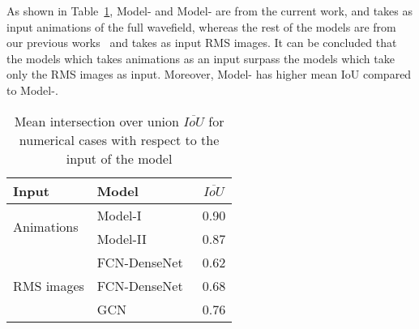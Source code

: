 As shown in Table~\ref{tab:meanIoU_vs_input}, Model- and Model- are from the current work, and takes as input animations of the full wavefield, whereas the rest of the models are from our previous works~\cite{Ijjeh2021, Ijjeh2022} and takes as input RMS images.
It can be concluded that the models which takes animations as an input surpass the models which take only the RMS images as input. 
Moreover, Model- has higher mean IoU compared to Model-.
\begin{table}[]
	\centering
	\caption{Mean intersection over union \(\overline{IoU}\) for numerical cases with respect to the input of the model}
	\begin{tabular}{llc}
		\toprule
		Input & Model & \(\overline{IoU}\) \\ 
		\midrule
		\multirow{2}{*}{Animations} & Model-I & 0.90 \\ & Model-II                    & 0.87     \\ \midrule
		\multirow{3}{*}{RMS images}  & FCN-DenseNet~\cite{Ijjeh2021} & 0.62     \\
		& FCN-DenseNet~\cite{Ijjeh2022} & 0.68     \\
		& GCN~\cite{Ijjeh2022}          & 0.76     \\ 
		\bottomrule
	\end{tabular}
	\label{tab:meanIoU_vs_input}
\end{table}

